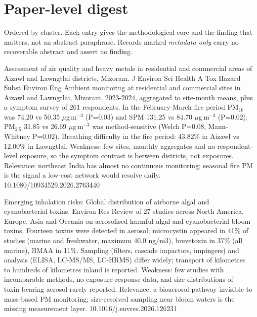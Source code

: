 \documentclass[10pt]{article}
\begin{document}
\vspace{4mm}

\par{}\baselineskip{}\baselineskip
\section*{\sffamily\bfseries\color{Deep}Paper-level digest}
\vspace{-1.5mm}{\color{Amber}\rule{\linewidth}{1.1pt}}\vspace{2.5mm}

{\fontsize{7.4}{9}\selectfont\color{Slate}Ordered by cluster. Each entry gives the
methodological core and the finding that matters, not an abstract paraphrase. Records
marked \textit{metadata only} carry no recoverable abstract and assert no finding.\par}


{Assessment of air quality and heavy metals in residential and commercial areas of Aizawl and Lawngtlai districts, Mizoram.}
{J Environ Sci Health A Tox Hazard Subst Environ Eng}
{Ambient monitoring at residential and commercial sites in Aizawl and Lawngtlai, Mizoram, 2023-2024, aggregated to site-month means, plus a symptom survey of 261 respondents. In the February-March fire period PM$_{10}$ was 74.20 vs 50.35 $\mu$g\,m$^{-3}$ (P=0.03) and SPM 131.25 vs 84.70 $\mu$g\,m$^{-3}$ (P=0.02); PM$_{2.5}$ 31.85 vs 26.69 $\mu$g\,m$^{-3}$ was method-sensitive (Welch P=0.08, Mann-Whitney P=0.02). Breathing difficulty in the fire period: 43.82\% in Aizawl vs 12.00\% in Lawngtlai. Weakness: few sites, monthly aggregates and no respondent-level exposure, so the symptom contrast is between districts, not exposures. Relevance: northeast India has almost no continuous monitoring; seasonal fire PM is the signal a low-cost network would resolve daily.}
{10.1080/10934529.2026.2763440}

{Emerging inhalation risks: Global distribution of airborne algal and cyanobacterial toxins.}
{Environ Res}
{Review of 27 studies across North America, Europe, Asia and Oceania on aerosolised harmful algal and cyanobacterial bloom toxins. Fourteen toxins were detected in aerosol; microcystin appeared in 41\% of studies (marine and freshwater, maximum 40.0 ng/m3), brevetoxin in 37\% (all marine), BMAA in 11\%. Sampling (filters, cascade impactors, impingers) and analysis (ELISA, LC-MS/MS, LC-HRMS) differ widely; transport of kilometres to hundreds of kilometres inland is reported. Weakness: few studies with incomparable methods, no exposure-response data, and size distributions of toxin-bearing aerosol rarely reported. Relevance: a bioaerosol pathway invisible to mass-based PM monitoring; size-resolved sampling near bloom waters is the missing measurement layer.}
{10.1016/j.envres.2026.126231}
\end{document}
